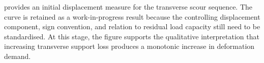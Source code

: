  provides an initial displacement measure for the transverse scour sequence. The curve is retained as a work-in-progress result because the controlling displacement component, sign convention, and relation to residual load capacity still need to be standardised. At this stage, the figure supports the qualitative interpretation that increasing transverse support loss produces a monotonic increase in deformation demand.


